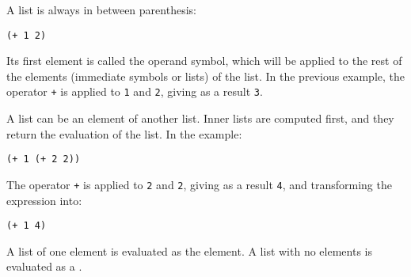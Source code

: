 A list is always in between parenthesis:
\begin{lstlisting}
(+ 1 2)
\end{lstlisting}

Its first element is called the operand symbol, which will be applied to the rest of the elements (immediate symbols or lists) of the list. In the previous example, the operator \texttt{+} is applied to \texttt{1} and \texttt{2}, giving as a result \texttt{3}.

A list can be an element of another list. Inner lists are computed first, and they return the evaluation of the list. In the example:
\begin{lstlisting}
(+ 1 (+ 2 2))
\end{lstlisting}
The operator \texttt{+} is applied to \texttt{2} and \texttt{2}, giving as a result \texttt{4}, and transforming the expression into:
\begin{lstlisting}
(+ 1 4)
\end{lstlisting}

A list of one element is evaluated as the element. A list with no elements is evaluated as a .

